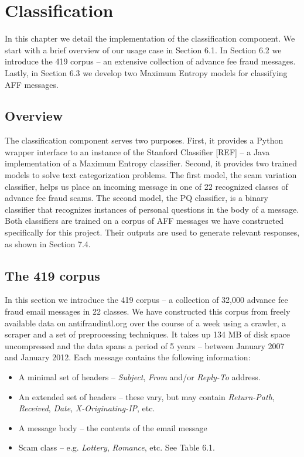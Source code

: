 \chapter{Classification}
In this chapter we detail the implementation of the classification component. We start with a brief overview of our usage case in Section 6.1. In Section 6.2 we introduce the 419 corpus -- an extensive collection of advance fee fraud messages. Lastly, in Section 6.3 we develop two Maximum Entropy models for classifying AFF messages.

\section{Overview}
The classification component serves two purposes. First, it provides a Python wrapper interface to an instance of the Stanford Classifier [REF] -- a Java implementation of a Maximum Entropy classifier. Second, it provides two trained models to solve text categorization problems. The first model, the scam variation classifier, helps us place an incoming message in one of 22 recognized classes of advance fee fraud scams. The second model, the PQ classifier, is a binary classifier that recognizes instances of personal questions in the body of a message. Both classifiers are trained on a corpus of AFF messages we have constructed specifically for this project. Their outputs are used to generate relevant responses, as shown in Section 7.4.

\section{The 419 corpus}
In this section we introduce the 419 corpus -- a collection of 32,000 advance fee fraud email messages in 22 classes. We have constructed this corpus from freely available data on antifraudintl.org over the course of a week using a crawler, a scraper and a set of preprocessing techniques. It takes up 134 MB of disk space uncompressed and the data spans a period of 5 years -- between January 2007 and January 2012.  Each message contains the following information:
\begin{itemize}
	\item A minimal set of headers -- \emph{Subject}, \emph{From} and/or \emph{Reply-To} address.
	\item An extended set of headers -- these vary, but may contain \emph{Return-Path}, \emph{Received}, \emph{Date}, \emph{X-Originating-IP}, etc.
	\item A message body -- the contents of the email message
	\item Scam class -- e.g. \emph{Lottery}, \emph{Romance}, etc. See Table 6.1.
\end{itemize}

